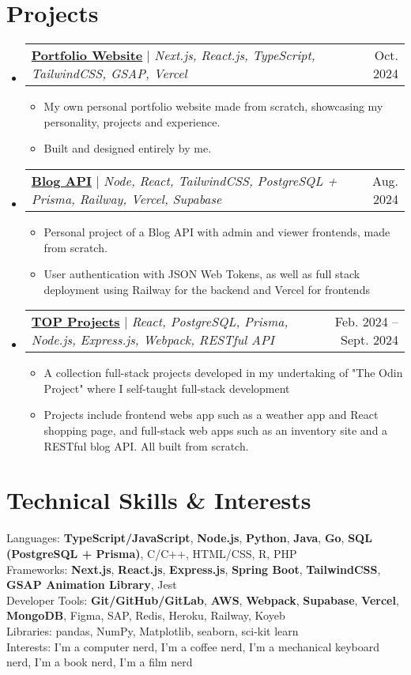 \documentclass[letterpaper,11pt]{article}
\makeatletter
\newcommand{\resumeItem}[1]{
  \item\small{
    {#1 \vspace{-2pt}}
  }
}
\newcommand{\resumeProjectHeading}[2]{
    \item
    \begin{tabular*}{0.97\textwidth}{l@{\extracolsep{\fill}}r}
      \small#1 & #2 \\
    \end{tabular*}\vspace{-7pt}
}
\newcommand{\resumeSubHeadingListStart}{\begin{itemize}[leftmargin=0.15in, label={}]}
\newcommand{\resumeSubHeadingListEnd}{\end{itemize}}
\newcommand{\resumeItemListStart}{\begin{itemize}}
\newcommand{\resumeItemListEnd}{\end{itemize}\vspace{-5pt}}
\makeatother
\begin{document}
\section{Projects}
    \resumeSubHeadingListStart
      \resumeProjectHeading
        {\textbf{\href{https://edgr.live}{Portfolio Website}} $|$ \emph{Next.js, React.js, TypeScript, TailwindCSS, GSAP, Vercel}}{Oct. 2024}
          \resumeItemListStart
          \resumeItem{My own personal portfolio website made from scratch, showcasing my personality, projects and experience.}
          \resumeItem{Built and designed entirely by me.}
          \resumeItemListEnd
      \resumeProjectHeading
        {\textbf{\href{https://edgr-odin-blog-access.vercel.app/}{Blog API}} $|$ \emph{Node, React, TailwindCSS, PostgreSQL + Prisma, Railway, Vercel, Supabase}}{Aug. 2024}
          \resumeItemListStart
            \resumeItem{Personal project of a Blog API with admin and viewer frontends, made from scratch.}
            \resumeItem{User authentication with JSON Web Tokens, as well as full stack deployment using Railway for the backend and Vercel for frontends}
          \resumeItemListEnd
        \resumeProjectHeading
        {\textbf{\href{https://safarinexus.github.io/edgr-odinprojects/}{TOP Projects}} $|$ \emph{React, PostgreSQL, Prisma, Node.js, Express.js, Webpack, RESTful API}}{Feb. 2024 -- Sept. 2024}
          \resumeItemListStart
          \resumeItem{A collection full-stack projects developed in my undertaking of "The Odin Project" where I self-taught full-stack development}
          \resumeItem{Projects include frontend webs app such as a weather app and React shopping page, and full-stack web apps such as an inventory site and a RESTful blog API. All built from scratch.}
          \resumeItemListEnd
    \resumeSubHeadingListEnd


\section{Technical Skills \& Interests}
 \begin{itemize}[leftmargin=0.15in, label={}]
    \small{\item{
      {Languages}{: \textbf{TypeScript/JavaScript}, \textbf{Node.js}, \textbf{Python}, \textbf{Java}, \textbf{Go}, \textbf{SQL (PostgreSQL + Prisma)}, C/C++, HTML/CSS, R, PHP} \\
      {Frameworks}{: \textbf{Next.js}, \textbf{React.js}, \textbf{Express.js}, \textbf{Spring Boot}, \textbf{TailwindCSS}, \textbf{GSAP Animation Library}, Jest} \\
      {Developer Tools}{: \textbf{Git/GitHub/GitLab}, \textbf{AWS}, \textbf{Webpack}, \textbf{Supabase}, \textbf{Vercel}, \textbf{MongoDB}, Figma, SAP, Redis, Heroku, Railway, Koyeb} \\
     {Libraries}{: pandas, NumPy, Matplotlib, seaborn, sci-kit learn} \\
     {Interests}{: I’m a computer nerd, I’m a coffee nerd, I’m a mechanical keyboard nerd, I’m a book nerd, I’m a film nerd}
    }}
 \end{itemize}
\end{document}

